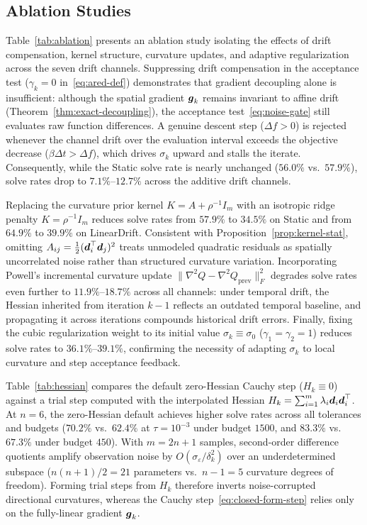 \subsection{Ablation Studies}
\label{sec:ablations}



Table~\ref{tab:ablation} presents an ablation study isolating the effects of drift compensation, kernel structure, curvature updates, and adaptive regularization across the seven drift channels. Suppressing drift compensation in the acceptance test ($\gamma_k = 0$ in~\eqref{eq:ared-def}) demonstrates that gradient decoupling alone is insufficient: although the spatial gradient $\boldsymbol{g}_k$ remains invariant to affine drift (Theorem~\ref{thm:exact-decoupling}), the acceptance test~\eqref{eq:noise-gate} still evaluates raw function differences. A genuine descent step ($\Delta f > 0$) is rejected whenever the channel drift over the evaluation interval exceeds the objective decrease ($\beta \Delta t > \Delta f$), which drives $\sigma_k$ upward and stalls the iterate. Consequently, while the Static solve rate is nearly unchanged ($56.0\%$ vs.\ $57.9\%$), solve rates drop to $7.1\%$--$12.7\%$ across the additive drift channels.

Replacing the curvature prior kernel $K = A + \rho^{-1} I_m$ with an isotropic ridge penalty $K = \rho^{-1} I_m$ reduces solve rates from $57.9\%$ to $34.5\%$ on Static and from $64.9\%$ to $39.9\%$ on LinearDrift. Consistent with Proposition~\ref{prop:kernel-stat}, omitting $A_{ij} = \tfrac{1}{2}(\boldsymbol{d}_i^\top \boldsymbol{d}_j)^2$ treats unmodeled quadratic residuals as spatially uncorrelated noise rather than structured curvature variation. Incorporating Powell's incremental curvature update $\|\nabla^2 Q - \nabla^2 Q_{\mathrm{prev}}\|_F^2$ degrades solve rates even further to $11.9\%$--$18.7\%$ across all channels: under temporal drift, the Hessian inherited from iteration $k-1$ reflects an outdated temporal baseline, and propagating it across iterations compounds historical drift errors. Finally, fixing the cubic regularization weight to its initial value $\sigma_k \equiv \sigma_0$ ($\gamma_1 = \gamma_2 = 1$) reduces solve rates to $36.1\%$--$39.1\%$, confirming the necessity of adapting $\sigma_k$ to local curvature and step acceptance feedback.



Table~\ref{tab:hessian} compares the default zero-Hessian Cauchy step ($H_k \equiv 0$) against a trial step computed with the interpolated Hessian $H_k = \sum_{i=1}^m \lambda_i \boldsymbol{d}_i \boldsymbol{d}_i^\top$. At $n = 6$, the zero-Hessian default achieves higher solve rates across all tolerances and budgets ($70.2\%$ vs.\ $62.4\%$ at $\tau = 10^{-3}$ under budget $1500$, and $83.3\%$ vs.\ $67.3\%$ under budget $450$). With $m = 2n+1$ samples, second-order difference quotients amplify observation noise by $O(\sigma_\varepsilon/\delta_k^2)$ over an underdetermined subspace ($n(n+1)/2 = 21$ parameters vs.\ $n-1 = 5$ curvature degrees of freedom). Forming trial steps from $H_k$ therefore inverts noise-corrupted directional curvatures, whereas the Cauchy step~\eqref{eq:closed-form-step} relies only on the fully-linear gradient $\boldsymbol{g}_k$.

